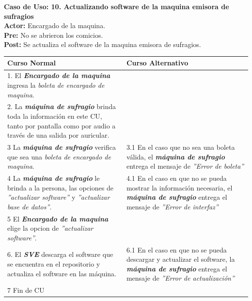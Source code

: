 \documentclass[spanish, 10pt,a4paper]{article}
\numberwithin{equation}{section} %
\begin{document}
\clearpage
\noindent\textbf{Caso de Uso: 10. Actualizando software de la maquina emisora de sufragios}\\
\textbf{Actor: } Encargado de la maquina.\\
\textbf{Pre: } No se abrieron los comicios.\\
\textbf{Post: } Se actualiza el software de la maquina emisora de sufragios.\\
\begin{table}[H]
  \centering
\bgroup
\def\arraystretch{1.3}
  \begin{tabular}{p{9cm} | p{7cm}}
    \hline
    Curso Normal & Curso Alternativo \\
    \hline
    \hline    
    1. El \textbf{\textit{Encargado de la maquina}} ingresa la \textit{boleta de encargado de maquina}. 
    & \\
    
    \hline
    2. La \textbf{\textit{máquina de sufragio}} brinda toda la información en este CU, tanto por pantalla como por audio a través de una salida por auricular.
    &
    \\
    
    \hline
    3 La \textbf{\textit{máquina de sufragio}} verifica que sea una \textit{boleta de encargado de maquina}.
    & 
    3.1 En el caso que no sea una boleta válida, el \textbf{\textit{máquina de sufragio}} entrega el mensaje de \textit{''Error de boleta''}
    \\
    
    \hline
    4 La \textbf{\textit{máquina de sufragio}} le brinda a la persona, las opciones de \textit{''actualizar software''} y \textit{''actualizar base de datos''}.
    & 
    4.1 En el caso en que no se pueda mostrar la información necesaria, el \textbf{\textit{máquina de sufragio}} entrega el mensaje de \textit{''Error de interfaz''}
    \\
    
    \hline
    5 El \textbf{\textit{Encargado de la maquina}} elige la opcion de \textit{''actualizar software''}.
    & \\
    
    \hline
    6. El \textbf{\textit{SVE}} descarga el software que se encuentra en el repositorio y actualiza el software en las máquina.
    &
    6.1 En el caso en que no se pueda descargar y actualizar el software, la \textbf{\textit{máquina de sufragio}} entrega el mensaje de \textit{''Error de actualización''}
    \\
    
    \hline
    7 Fin de CU
    & \\
    \hline
  \end{tabular}
\egroup
\end{table}
\end{document}
